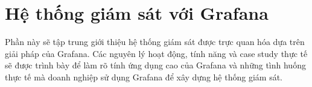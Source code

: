 \chapter{Hệ thống giám sát với Grafana}
Phần này sẽ tập trung giới thiệu hệ thống giám sát được trực quan hóa dựa trên giải pháp của Grafana. Các nguyên lý hoạt động, tính năng và case study thực tế sẽ được trình bày để làm rõ tính ứng dụng cao của Grafana và những tình huống thực tế mà doanh nghiệp sử dụng Grafana để xây dựng hệ thống giám sát.



